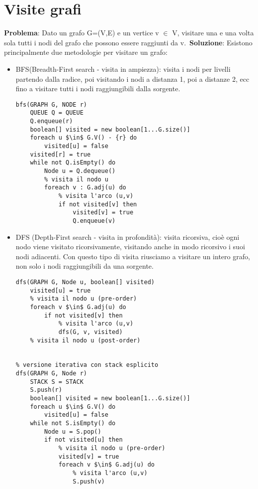 \documentclass[../cheatSheetAlgoritmi.tex]{subfiles}
\begin{document}
\section{Visite grafi}
\textbf{Problema}: Dato un grafo G=(V,E) e un vertice v $\in$ V,
visitare una e una volta sola tutti i nodi del grafo che possono essere raggiunti da v.\
\textbf{Soluzione}: Esistono principalmente due metodologie per visitare un grafo:\
\begin{itemize}
\item BFS(Breadth-First search - visita in ampiezza): visita i nodi per livelli partendo dalla radice, poi visitando i nodi a distanza 1, poi a distanze 2, ecc fino a visitare tutti i nodi raggiungibili dalla sorgente.

\begin{adjustbox}{max width=\linewidth}
\begin{lstlisting}[caption= Visita BFS]
bfs(GRAPH G, NODE r)
	QUEUE Q = QUEUE
	Q.enqueue(r)
	boolean[] visited = new boolean[1...G.size()]
	foreach u $\in$ G.V() - {r} do
		visited[u] = false
	visited[r] = true
	while not Q.isEmpty() do
		Node u = Q.dequeue()
		% visita il nodo u
		foreach v : G.adj(u) do
			% visita l'arco (u,v)
			if not visited[v] then
				visited[v] = true
				Q.enqueue(v)
\end{lstlisting}
\end{adjustbox}
	\item DFS (Depth-First search - visita in profondità): visita ricorsiva, cioè ogni nodo viene visitato ricorsivamente, visitando anche in modo ricorsivo i suoi nodi adiacenti. Con questo tipo di visita riusciamo a visitare un intero grafo, non solo i nodi raggiungibili da una sorgente.
\begin{adjustbox}{max width=\linewidth}
\begin{lstlisting}[caption= Visita DFS]
% versione ricorsiva con stack implicito
dfs(GRAPH G, Node u, boolean[] visited)
	visited[u] = true
	% visita il nodo u (pre-order)
	foreach v $\in$ G.adj(u) do
		if not visited[v] then
			% visita l'arco (u,v)
			dfs(G, v, visited)
	% visita il nodo u (post-order)


% versione iterativa con stack esplicito
dfs(GRAPH G, Node r)
	STACK S = STACK
	S.push(r)
	boolean[] visited = new boolean[1...G.size()]
	foreach u $\in$ G.V() do
		visited[u] = false
	while not S.isEmpty() do
		Node u = S.pop()
		if not visited[u] then
			% visita il nodo u (pre-order)
			visited[v] = true
			foreach v $\in$ G.adj(u) do
				% visita l'arco (u,v)
				S.push(v)
\end{lstlisting}
\end{adjustbox}
\end{itemize}
\newpage
\end{document}
